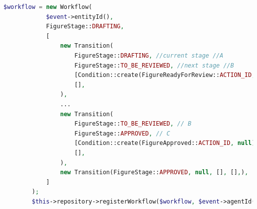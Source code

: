 \begin{lstlisting}[language=php, caption={Workflow registration for a Figure document to be approved by the EB.}, basicstyle=\tiny, label=lst:figure_wf]
$workflow = new Workflow(
            $event->entityId(),
            FigureStage::DRAFTING,
            [
                new Transition(
                    FigureStage::DRAFTING, //current stage //A
                    FigureStage::TO_BE_REVIEWED, //next stage //B
                    [Condition::create(FigureReadyForReview::ACTION_ID, null)], //analogous to x, y, z
                    [],
                ),
                ...
                new Transition(
                    FigureStage::TO_BE_REVIEWED, // B
                    FigureStage::APPROVED, // C
                    [Condition::create(FigureApproved::ACTION_ID, null)], //analogous to m,n
                    [],
                ),
                new Transition(FigureStage::APPROVED, null, [], [],),
            ]
        );
        $this->repository->registerWorkflow($workflow, $event->agentId());
\end{lstlisting}



